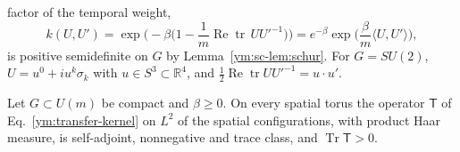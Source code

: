 factor of the temporal weight,
\begin{equation}\label{ym:sc-link-kernel}
 k(U,U')=\exp\Big(-\beta\Big(1-\frac1m\operatorname{Re}\operatorname{tr}\,
 UU'^{-1}\Big)\Big)=e^{-\beta}\exp\Big(\frac\beta m\langle U,U'\rangle\Big),
\end{equation}
is positive semidefinite on $G$ by Lemma~\ref{ym:sc-lem:schur}. For
$G=SU(2)$, $U=u^0+iu^k\sigma_k$ with $u\in S^3\subset\mathbb R^4$, and
$\frac12\operatorname{Re}\operatorname{tr}UU'^{-1}=u\cdot u'$.
\begin{proposition}\label{ym:sc-prop:positivity}
Let $G\subset U(m)$ be compact and $\beta\ge0$. On every spatial torus the
operator $\mathsf T$ of Eq.~\eqref{ym:transfer-kernel} on $L^2$ of the spatial
configurations, with product Haar measure, is self-adjoint, nonnegative and
trace class, and $\operatorname{Tr}\mathsf T>0$.
\end{proposition}

